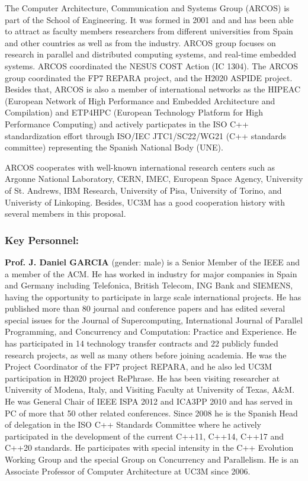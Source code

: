 \documentclass[a4paper,11pt]{article}
\begin{document}
The Computer Architecture, Communication and Systems Group (ARCOS) is part of the School of Engineering. It was formed in 2001 and and has been able to attract as faculty members researchers from different
universities from Spain and other countries as well as from the industry. ARCOS group focuses on research in
parallel and distributed computing systems, and real-time embedded systems. ARCOS coordinated the NESUS COST Action (IC 1304). The ARCOS group coordinated the  FP7 REPARA project, and the H2020 ASPIDE project. Besides that, ARCOS is also a member of international networks as the HIPEAC (European Network of High Performance and Embedded Architecture and Compilation) and ETP4HPC (European
Technology Platform for High Performance Computing) and actively particpates in the ISO C++ standardization effort through ISO/IEC JTC1/SC22/WG21 (C++ standards committee) representing the Spanish National
Body (UNE).

ARCOS cooperates with well-known international research centers such as Argonne National Laboratory, CERN, IMEC, European Space Agency, University of St. Andrews, IBM Research, University of Pisa, University of Torino, and Univeristy of Linkoping. Besides, UC3M has a good cooperation history with several members in this proposal.


\subsubsection*{Key Personnel:}

\textbf{Prof. J. Daniel GARCIA} (gender: male) is a Senior Member of the IEEE and a member of the ACM. He has worked in industry for major companies in Spain and Germany including Telefonica, British Telecom, ING Bank and SIEMENS, having the opportunity to participate in large scale international projects.
He has published more than 80 journal and conference papers and has edited several special issues for the Journal of Supercomputing, International Journal of Parallel Programming, and Concurrency and Computation: Practice and Experience. He has participated in 14 technology transfer contracts and 22 publicly funded research projects, as well as many others before joining academia. He was the Project Coordinator of the FP7 project REPARA, and he also led UC3M participation in H2020 project RePhrase.
He has been visiting researcher at University of Modena, Italy, and Visiting Faculty at University of
Texas, A\&M. He was General Chair of IEEE ISPA 2012 and ICA3PP 2010 and has served in PC of
more that 50 other related conferences. Since 2008 he is the Spanish Head of delegation in the ISO
C++ Standards Committee where he actively participated in the development of the current C++11, C++14, C++17 and C++20 standards. He participates with special intensity in the C++ Evolution Working Group and the special Group on Concurrency and Parallelism. He is an
Associate Professor of Computer Architecture at UC3M since 2006.
\end{document}
